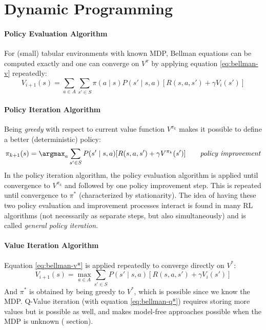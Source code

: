 \section{Dynamic Programming}
\label{section:dp}

\paragraph{Policy Evaluation Algorithm}
For (small) tabular environments with known MDP, Bellman equations can be computed exactly and one can converge on $V^{\pi}$ by applying equation \ref{eq:bellman-v} repeatedly:
\[
    V_{i+1}(s) = \sum_{a\in A} \sum_{s' \in S} \pi(a\mid s) P(s'\mid s,a) [R(s,a,s') + \gamma V_i(s')]
\]

\paragraph{Policy Iteration Algorithm}
Being \emph{greedy} with respect to current value function $V^{\pi_k}$ makes it possible to define a better (deterministic) policy: 
\[
    \pi_{k+1}(s) = \argmax_a \sum_{s' \in S} P(s'\mid s,a) [R(s,a,s') + \gamma V^{\pi_k}(s')] \tag*{\emph{policy improvement}}
\]
In the policy iteration algorithm, the policy evaluation algorithm is applied until convergence to $V^{\pi_k}$ and followed by one policy improvement step. This is repeated until convergence to $\pi^*$ (characterized by stationarity). The idea of having these two policy evaluation and improvement processes interact is found in many RL algorithms (not necessarily as separate steps, but also simultaneously) and is called \emph{general policy iteration}.

\paragraph{Value Iteration Algorithm}
Equation \ref{eq:bellman-v*} is applied repeatedly to converge directly on $V^*$:
\[
    V_{i+1}(s) = \max_{a\in A} \sum_{s' \in S} P(s'\mid s,a) [R(s,a,s') + \gamma V_i(s')]
\]
And $\pi^*$ is obtained by being greedy to $V^*$, which is possible since we know the MDP. Q-Value iteration (with equation \ref{eq:bellman-q*}) requires storing more values but is possible as well, and makes model-free approaches possible when the MDP is unknown ( section).